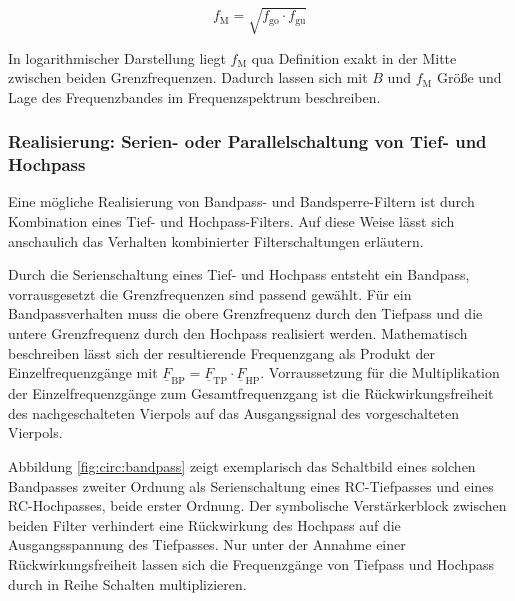 \begin{frame}
{    \begin{equation}\label{eq:def:fm}
        f_{\mathrm{M}} = \sqrt{f_{\mathrm{go}} \cdot f_{\mathrm{gu}}}
    \end{equation}

    In logarithmischer Darstellung liegt $f_{\mathrm{M}}$ qua Definition exakt in der Mitte zwischen beiden Grenzfrequenzen.
    Dadurch lassen sich mit $B$ und $f_{\mathrm{M}}$ Größe und Lage des Frequenzbandes im Frequenzspektrum beschreiben.

    \subsubsection{Realisierung: Serien- oder Parallelschaltung von Tief- und Hochpass} %
    
    Eine mögliche Realisierung von Bandpass- und Bandsperre-Filtern ist durch Kombination eines Tief- und Hochpass-Filters.
    Auf diese Weise lässt sich anschaulich das Verhalten kombinierter Filterschaltungen erläutern.

    Durch die Serienschaltung eines Tief- und Hochpass entsteht ein Bandpass, vorrausgesetzt die Grenzfrequenzen sind passend gewählt.
    Für ein Bandpassverhalten muss die obere Grenzfrequenz durch den Tiefpass und die untere Grenzfrequenz durch den Hochpass realisiert werden.
    Mathematisch beschreiben lässt sich der resultierende Frequenzgang als Produkt der Einzelfrequenzgänge mit
    $\underline{F}_{\mathrm{BP}} = \underline{F}_{\mathrm{TP}} \cdot \underline{F}_{\mathrm{HP}}$. 
    Vorraussetzung für die Multiplikation der Einzelfrequenzgänge zum Gesamtfrequenzgang ist die Rückwirkungsfreiheit 
    des nachgeschalteten Vierpols auf das Ausgangssignal des vorgeschalteten Vierpols. 

    Abbildung \ref{fig:circ:bandpass} zeigt exemplarisch das Schaltbild eines solchen Bandpasses zweiter Ordnung als
    Serienschaltung eines RC-Tiefpasses und eines RC-Hochpasses, beide erster Ordnung.
    Der symbolische Verstärkerblock zwischen beiden Filter verhindert eine Rückwirkung des Hochpass auf die Ausgangsspannung des Tiefpasses. 
    Nur unter der Annahme einer Rückwirkungsfreiheit lassen sich die Frequenzgänge von Tiefpass und Hochpass durch in Reihe Schalten multiplizieren.


}
\end{frame}
